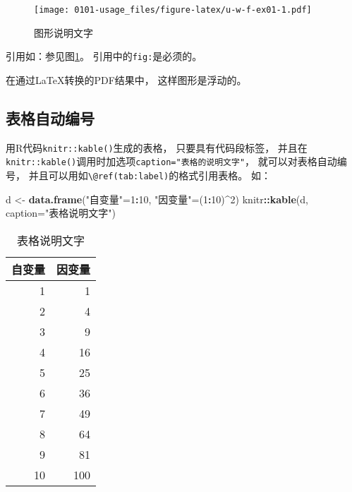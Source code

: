 \documentclass[
]{book}
\newenvironment{Shaded}{\begin{snugshade}}{\end{snugshade}}
\newcommand{\DataTypeTok}[1]{\textcolor[rgb]{0.13,0.29,0.53}{#1}}
\newcommand{\DecValTok}[1]{\textcolor[rgb]{0.00,0.00,0.81}{#1}}
\newcommand{\KeywordTok}[1]{\textcolor[rgb]{0.13,0.29,0.53}{\textbf{#1}}}
\newcommand{\NormalTok}[1]{#1}
\newcommand{\OperatorTok}[1]{\textcolor[rgb]{0.81,0.36,0.00}{\textbf{#1}}}
\newcommand{\StringTok}[1]{\textcolor[rgb]{0.31,0.60,0.02}{#1}}
\theoremstyle{definition}
\theoremstyle{definition}
\theoremstyle{definition}
\theoremstyle{definition}
\theoremstyle{remark}
\begin{document}
\begin{figure}
\centering
\texttt{[image: 0101-usage\_files/figure-latex/u-w-f-ex01-1.pdf]}
\caption{\label{fig:u-w-f-ex01}图形说明文字}
\end{figure}

引用如：参见图\ref{fig:u-w-f-ex01}。
引用中的\texttt{fig:}是必须的。

在通过LaTeX转换的PDF结果中，
这样图形是浮动的。

\hypertarget{usage-writing-tab}{%
\subsection{表格自动编号}\label{usage-writing-tab}}

用R代码\texttt{knitr::kable()}生成的表格，
只要具有代码段标签，
并且在\texttt{knitr::kable()}调用时加选项\texttt{caption="表格的说明文字"}，
就可以对表格自动编号，
并且可以用如\texttt{\textbackslash{}@ref(tab:label)}的格式引用表格。
如：

\begin{Shaded}
\begin{Highlighting}[]
\NormalTok{d <-}\StringTok{ }\KeywordTok{data.frame}\NormalTok{(}\StringTok{"自变量"}\NormalTok{=}\DecValTok{1}\OperatorTok{:}\DecValTok{10}\NormalTok{, }\StringTok{"因变量"}\NormalTok{=(}\DecValTok{1}\OperatorTok{:}\DecValTok{10}\NormalTok{)}\OperatorTok{^}\DecValTok{2}\NormalTok{)}
\NormalTok{knitr}\OperatorTok{::}\KeywordTok{kable}\NormalTok{(d, }\DataTypeTok{caption=}\StringTok{"表格说明文字"}\NormalTok{)}
\end{Highlighting}
\end{Shaded}

\begin{table}

\caption{\label{tab:u-w-tab-ex01}表格说明文字}
\centering
\begin{tabular}[t]{r|r}
\hline
自变量 & 因变量\\
\hline
1 & 1\\
\hline
2 & 4\\
\hline
3 & 9\\
\hline
4 & 16\\
\hline
5 & 25\\
\hline
6 & 36\\
\hline
7 & 49\\
\hline
8 & 64\\
\hline
9 & 81\\
\hline
10 & 100\\
\hline
\end{tabular}
\end{table}
\end{document}
